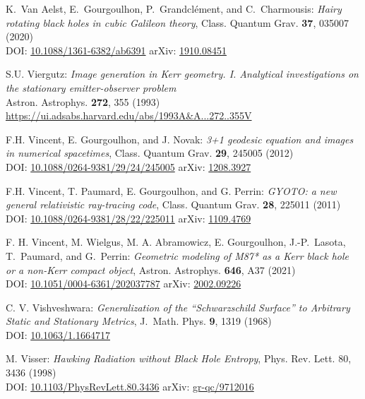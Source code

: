 \begin{thebibliography}{123}
K.~Van Aelst, E.~Gourgoulhon, P.~Grandclément, and C.~Charmousis:
{\em Hairy rotating black holes in cubic Galileon theory},
Class. Quantum Grav. {\bf 37}, 035007 (2020)\\
DOI: \href{https://doi.org/10.1088/1361-6382/ab6391}{10.1088/1361-6382/ab6391}\hfill
arXiv: \href{https://arxiv.org/abs/1910.08451}{1910.08451}

S.U. Viergutz:
{\em Image generation in Kerr geometry. I. Analytical investigations on the stationary emitter-observer problem}\\
Astron. Astrophys. {\bf 272}, 355 (1993)\\
\url{https://ui.adsabs.harvard.edu/abs/1993A&A...272..355V}

F.H. Vincent, E. Gourgoulhon, and J. Novak:
{\em 3+1 geodesic equation and images in numerical spacetimes},
Class. Quantum Grav. {\bf 29}, 245005 (2012)\\
DOI: \href{https://doi.org/10.1088/0264-9381/29/24/245005}{10.1088/0264-9381/29/24/245005}\hfill
arXiv: \href{https://arxiv.org/abs/1208.3927}{1208.3927}

F.H. Vincent, T. Paumard, E. Gourgoulhon, and G. Perrin:
{\em GYOTO: a new general relativistic ray-tracing code},
Class. Quantum Grav. {\bf 28}, 225011 (2011)\\
DOI: \href{https://doi.org/10.1088/0264-9381/28/22/225011}{10.1088/0264-9381/28/22/225011}
\hfill
arXiv: \href{https://arxiv.org/abs/1109.4769}{1109.4769}

F. H. Vincent, M. Wielgus, M. A. Abramowicz, E. Gourgoulhon, J.-P.~Lasota, T.~Paumard,
and G.~Perrin:
{\em Geometric modeling of M87* as a Kerr black hole or a non-Kerr compact object},
Astron. Astrophys. {\bf 646}, A37 (2021)\\
DOI: \href{https://doi.org/10.1051/0004-6361/202037787}{10.1051/0004-6361/202037787}\hfill
arXiv: \href{https://arxiv.org/abs/2002.09226}{2002.09226}

C. V. Vishveshwara:
{\em Generalization of the ``Schwarzschild Surface'' to Arbitrary Static and Stationary Metrics},
J.~Math. Phys. {\bf 9}, 1319 (1968)\\
DOI: \href{https://doi.org/10.1063/1.1664717}{10.1063/1.1664717}

M. Visser: {\em Hawking Radiation without Black Hole Entropy},
Phys. Rev. Lett. 80, 3436 (1998)\\
DOI: \href{https://doi.org/10.1103/PhysRevLett.80.3436}{10.1103/PhysRevLett.80.3436}\hfill
arXiv: \href{https://arxiv.org/abs/gr-qc/9712016}{gr-qc/9712016}


\end{thebibliography}
